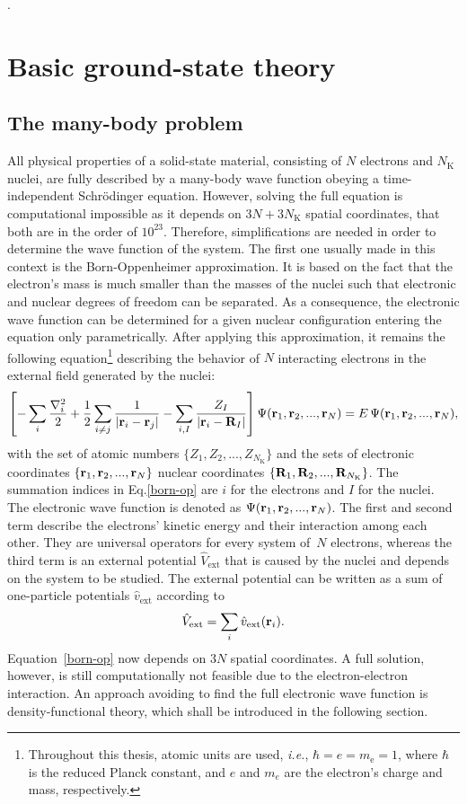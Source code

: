 \phantom.
\vspace{3cm}
\section{Basic ground-state theory}\label{dft_sec}


\subsection{The many-body problem}
All physical properties of a solid-state material, consisting of $N$ electrons and $N_\text{K}$ nuclei, are fully described by a many-body wave function obeying a time-independent Schr\"odinger equation. However, solving the full equation is computational impossible as it depends on $3N + 3N_\text{K}$ spatial coordinates, that both are in the order of $10^{23}$.
Therefore, simplifications are needed in order to determine the wave function of the system. The first one usually made in this context is the Born-Oppenheimer approximation. It is based on the fact that the electron's mass is much smaller than the masses of the nuclei such that electronic and nuclear degrees of freedom can be separated. As a consequence, the electronic wave function can be determined  for a given nuclear configuration entering the equation only parametrically. After applying this approximation, it remains the following equation\footnote[2]{Throughout this thesis, atomic units are used, \textit{i.e.}, $\hbar=e=m_\text{e}=1$, where $\hbar$ is the reduced Planck constant, and $e$ and $m_e$ are the electron's charge and mass, respectively.}  describing the behavior of $N$ interacting electrons in the external field generated by the nuclei:
%
\begin{align}\label{born-op}
   \left[ -\sum_i\frac{\nabla^2_i}{2}  + \frac{1}{2}\sum_{i\neq j}\frac{1}{|\mathbf{r}_i - \mathbf{r}_j|} - \sum_{i,I}\frac{Z_I}{|\mathbf{r}_i - \mathbf{R}_I|}\right]\Psi(\mathbf{r}_1,\mathbf{r}_2,...,\mathbf{r}_N) = E\,\Psi(\mathbf{r}_1,\mathbf{r}_2,...,\mathbf{r}_N),
\end{align}
%
with the set of atomic numbers $\{Z_1,Z_2,...,Z_{N_\text{K}}\}$ and the sets of electronic coordinates  $\{\mathbf{r}_1,\mathbf{r}_2,...,\mathbf{r}_N\}$ nuclear coordinates $\{\mathbf{R}_1,\mathbf{R}_2,...,\mathbf{R}_{N_\text{K}}\}$. The summation indices in Eq.\;\eqref{born-op} are $i$ for the electrons and $I$ for the nuclei. The electronic wave function is denoted as $\Psi(\mathbf{r}_1,\mathbf{r}_2,...,\mathbf{r}_N)$. The first and second term describe the electrons' kinetic energy and their interaction among each other. They are universal operators for every system of~$N$ electrons, whereas the third term is an external potential $\hat{V}_\text{ext}$ that is caused by the nuclei and depends on the system to be studied. The external potential can be written as a sum of one-particle potentials $\hat{v}_\text{ext}$ according to
%
\begin{equation}
    \hat{V}_\text{ext} = \sum_i \hat{v}_\text{ext}(\mathbf{r}_i).
\end{equation}
%
Equation~\eqref{born-op} now depends on $3N$ spatial coordinates. A full solution, however, is still computationally not feasible due to the electron-electron interaction. An approach avoiding to find the full electronic wave function is density-functional theory, which shall be introduced in the following section.
%
